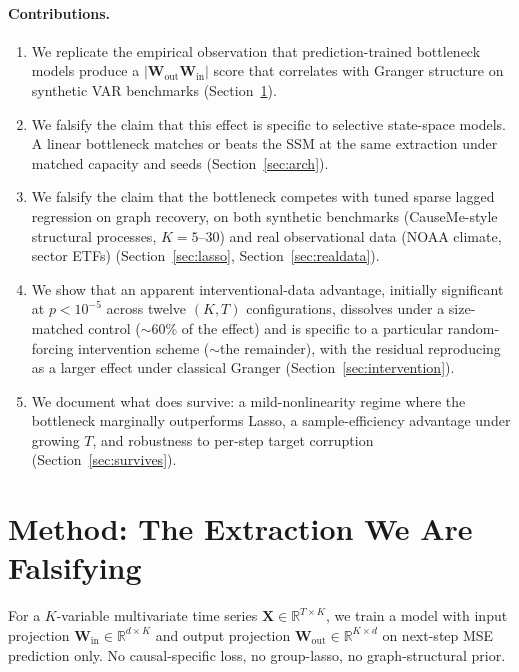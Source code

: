 \documentclass{article}
\begin{document}
\paragraph{Contributions.}
\begin{enumerate}[leftmargin=1.5em, topsep=0pt, itemsep=0pt]
  \item We replicate the empirical observation that prediction-trained
  bottleneck models produce a $|\mathbf{W}_{\text{out}}
  \mathbf{W}_{\text{in}}|$ score that correlates with Granger structure
  on synthetic VAR benchmarks (Section~\ref{sec:observation}).
  \item We falsify the claim that this effect is specific to
  selective state-space models. A linear bottleneck matches or beats
  the SSM at the same extraction under matched capacity and seeds
  (Section~\ref{sec:arch}).
  \item We falsify the claim that the bottleneck competes with tuned
  sparse lagged regression on graph recovery, on both synthetic
  benchmarks (CauseMe-style structural processes, $K=5$–$30$) and
  real observational data (NOAA climate, sector ETFs)
  (Section~\ref{sec:lasso}, Section~\ref{sec:realdata}).
  \item We show that an apparent interventional-data advantage,
  initially significant at $p < 10^{-5}$ across twelve
  $(K, T)$ configurations, dissolves under a size-matched control
  ($\sim$60\% of the effect) and is specific to a particular
  random-forcing intervention scheme ($\sim$the remainder), with the
  residual reproducing as a larger effect under classical Granger
  (Section~\ref{sec:intervention}).
  \item We document what does survive: a mild-nonlinearity regime
  where the bottleneck marginally outperforms Lasso, a
  sample-efficiency advantage under growing $T$, and robustness to
  per-step target corruption (Section~\ref{sec:survives}).
\end{enumerate}

\section{Method: The Extraction We Are Falsifying}
\label{sec:observation}

For a $K$-variable multivariate time series $\mathbf{X} \in
\mathbb{R}^{T \times K}$, we train a model with input projection
$\mathbf{W}_{\text{in}} \in \mathbb{R}^{d \times K}$ and output
projection $\mathbf{W}_{\text{out}} \in \mathbb{R}^{K \times d}$ on
next-step MSE prediction only. No causal-specific loss, no
group-lasso, no graph-structural prior.
\end{document}
